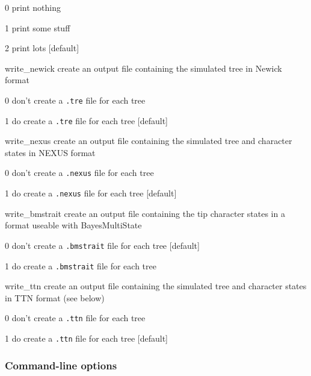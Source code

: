 \documentclass[10pt]{article}
\begin{document}
\begin{optdescrip}
\begin{valdescrip}
			\item[0] print nothing
			\item[1] print some stuff
			\item[2] print lots [default]
		\end{valdescrip}
	\item[write\_newick] create an output file containing the simulated tree in Newick format
		\begin{valdescrip}
			\item[0] don't create a \texttt{.tre} file for each tree
			\item[1] do create a \texttt{.tre} file for each tree [default]
		\end{valdescrip}
	\item[write\_nexus] create an output file containing the simulated tree and character states in NEXUS format
		\begin{valdescrip}
			\item[0] don't create a \texttt{.nexus} file for each tree
			\item[1] do create a \texttt{.nexus} file for each tree [default]
		\end{valdescrip}
	\item[write\_bmstrait] create an output file containing the tip character states in a format useable with BayesMultiState
		\begin{valdescrip}
			\item[0] don't create a \texttt{.bmstrait} file for each tree [default]
			\item[1] do create a \texttt{.bmstrait} file for each tree
		\end{valdescrip}
	\item[write\_ttn] create an output file containing the simulated tree and character states in TTN format (see below)
		\begin{valdescrip}
			\item[0] don't create a \texttt{.ttn} file for each tree
			\item[1] do create a \texttt{.ttn} file for each tree [default]
		\end{valdescrip}
\end{optdescrip}


\subsubsection*{Command-line options}
\end{document}

